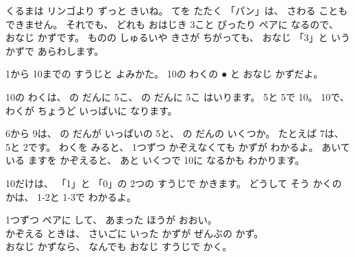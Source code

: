 \noindent くるまは リンゴより ずっと きいね。 てを たたく 「パン」は、 さわる ことも できません。 それでも、 どれも おはじき 3こと ぴったり ペアに なるので、 おなじ かずです。 ものの しゅるいや きさが ちがっても、 おなじ 「3」と いう かずで あらわします。


\label{bk:1-1:suuji}1から 10までの すうじと よみかた。 10の わくの ● と おなじ かずだよ。

\begin{bkfigure}
\end{bkfigure}

\noindent 10の わくは、 の だんに 5こ、 の だんに 5こ はいります。 5と 5で 10。 10で、 わくが ちょうど いっぱいに なります。

\noindent 6から 9は、 の だんが いっぱいの 5と、 の だんの いくつか。 たとえば 7は、 5と 2です。 わくを みると、 1つずつ かぞえなくても かずが わかるよ。 あいて いる ますを かぞえると、 あと いくつで 10に なるかも わかります。

\noindent 10だけは、 「1」と 「0」の 2つの すうじで かきます。 どうして そう かくのかは、 1-2と 1-3で わかるよ。\par\vspace{4pt}

\begin{taisetsu}
1つずつ ペアに して、 あまった ほうが おおい。\\
かぞえる ときは、 さいごに いった かずが ぜんぶの かず。\\
おなじ かずなら、 なんでも おなじ すうじで かく。
\end{taisetsu}

